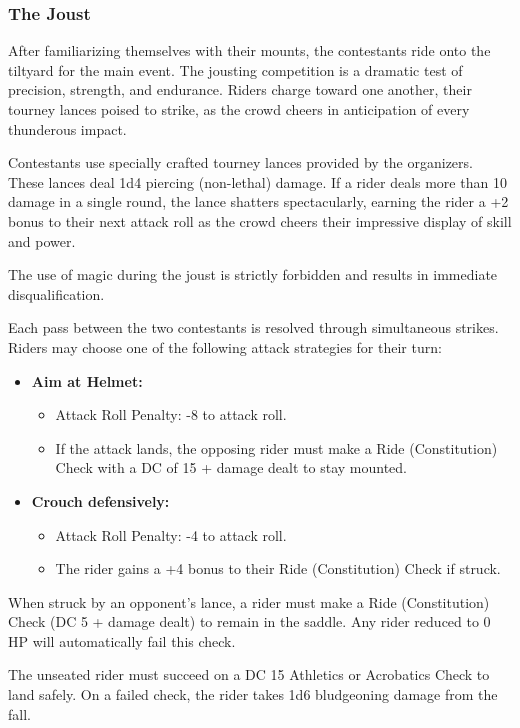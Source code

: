 \subsubsection*{The Joust}
{\entryfont After familiarizing themselves with their mounts, the contestants ride onto the tiltyard for the main event. The jousting competition is a dramatic test of precision, strength, and endurance. Riders charge toward one another, their tourney lances poised to strike, as the crowd cheers in anticipation of every thunderous impact.

Contestants use specially crafted tourney lances provided by the organizers. These lances deal 1d4 piercing (non-lethal) damage. If a rider deals more than 10 damage in a single round, the lance shatters spectacularly, earning the rider a +2 bonus to their next attack roll as the crowd cheers their impressive display of skill and power.

The use of magic during the joust is strictly forbidden and results in immediate disqualification.

Each pass between the two contestants is resolved through simultaneous strikes. Riders may choose one of the following attack strategies for their turn:

\begin{itemize}
	\renewcommand\labelitemi{\textbf{\textbullet}}
	\item \textbf{Aim at Helmet:}
	\begin{itemize}
		\item Attack Roll Penalty: -8 to attack roll.
		\item If the attack lands, the opposing rider must make a Ride (Constitution) Check with a DC of 15 + damage dealt to stay mounted.
	\end{itemize}
	\item \textbf{Crouch defensively:}
	\begin{itemize}
		\item Attack Roll Penalty: -4 to attack roll.
		\item The rider gains a +4 bonus to their Ride (Constitution) Check if struck.
	\end{itemize}
\end{itemize}

\noindent When struck by an opponent's lance, a rider must make a Ride (Constitution) Check (DC 5 + damage dealt) to remain in the saddle. Any rider reduced to 0 HP will automatically fail this check.

\noindent The unseated rider must succeed on a DC 15 Athletics or Acrobatics Check to land safely. On a failed check, the rider takes 1d6 bludgeoning damage from the fall.

}
